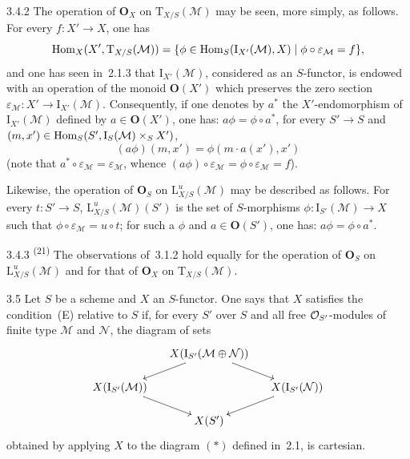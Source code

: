 \begin{remark}{3.4.2}
\label{II.3.4.2}
{\renewcommand{\thefootnote}{(21)}}
The operation of \(\mathbf{O}_X\) on \(\mathrm{T}_{X/S}(\mathcal{M})\) may be
seen, more simply, as follows. For every \(f\colon X'\to X\), one has
\[
\operatorname{Hom}_X(X',\mathrm{T}_{X/S}(\mathcal{M}))
=\{\phi\in\operatorname{Hom}_S(\mathrm{I}_{X'}(\mathcal{M}),X)
\mid\phi\circ\varepsilon_{\mathcal{M}}=f\},
\]
and one has seen in~2.1.3 that \(\mathrm{I}_{X'}(\mathcal{M})\), considered as
an \(S\)-functor, is endowed with an operation of the monoid
\(\mathbf{O}(X')\) which preserves the zero section
\(\varepsilon_{\mathcal{M}}\colon X'\to\mathrm{I}_{X'}(\mathcal{M})\).
Consequently, if one denotes by \(a^*\) the \(X'\)-endomorphism of
\(\mathrm{I}_{X'}(\mathcal{M})\) defined by \(a\in\mathbf{O}(X')\), one has:
\(a\phi=\phi\circ a^*\), \ie for every \(S'\to S\) and
\((m,x')\in\operatorname{Hom}_S(S',\mathrm{I}_S(\mathcal{M})\times_S X')\),
\[
(a\phi)(m,x')=\phi(m\cdot a(x'),x')
\]
(note that \(a^*\circ\varepsilon_{\mathcal{M}}=\varepsilon_{\mathcal{M}}\),
whence \((a\phi)\circ\varepsilon_{\mathcal{M}}=\phi\circ\varepsilon_{\mathcal{M}}=f\)).

Likewise, the operation of \(\mathbf{O}_S\) on
\(\mathrm{L}^{u}_{X/S}(\mathcal{M})\) may be described as follows. For every
\(t\colon S'\to S\), \(\mathrm{L}^{u}_{X/S}(\mathcal{M})(S')\) is the set of
\(S\)-morphisms \(\phi\colon\mathrm{I}_{S'}(\mathcal{M})\to X\) such that
\(\phi\circ\varepsilon_{\mathcal{M}}=u\circ t\); for such a \(\phi\) and
\(a\in\mathbf{O}(S')\), one has: \(a\phi=\phi\circ a^*\).
\end{remark}

\begin{remark}{3.4.3}
\label{II.3.4.3}
\textup{\textsuperscript{(21)}}
The observations of~3.1.2 hold equally for the operation of
\(\mathbf{O}_S\) on \(\mathrm{L}^{u}_{X/S}(\mathcal{M})\) and for that of
\(\mathbf{O}_X\) on \(\mathrm{T}_{X/S}(\mathcal{M})\).
\end{remark}

\begin{definition}{3.5}
\label{II.3.5}
Let \(S\) be a scheme and \(X\) an \(S\)-functor. One says that \(X\) satisfies
the condition~(E) relative to \(S\) if, for every \(S'\) over \(S\) and all free
\(\mathcal{O}_{S'}\)-modules of finite type \(\mathcal{M}\) and \(\mathcal{N}\), the
diagram of sets
\[
\xymatrix@C=1.4em@R=1.4em{
  & X(\mathrm{I}_{S'}(\mathcal{M}\oplus\mathcal{N})) \ar[dl] \ar[dr] & \\
  X(\mathrm{I}_{S'}(\mathcal{M})) \ar[dr]
    & & X(\mathrm{I}_{S'}(\mathcal{N})) \ar[dl] \\
  & X(S') &
}
\]
obtained by applying \(X\) to the diagram \((*)\) defined in~2.1, is
cartesian.%
{\renewcommand{\thefootnote}{(22)}}
\end{definition}

